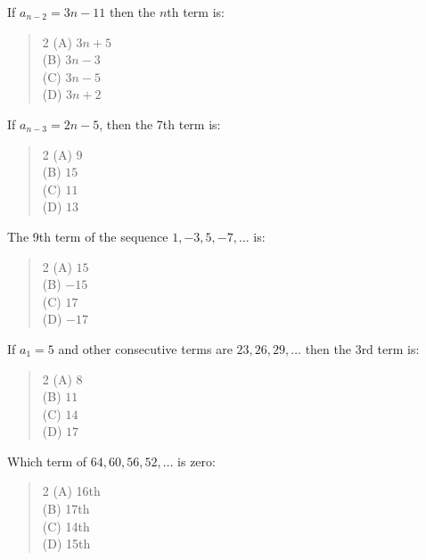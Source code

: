 \documentclass[11pt,a4paper]{article}
\begin{document}
\begin{mcqlist}
\item If $a_{n-2}=3n-11$ then the $n$th term is:
\begin{quote}\begin{multicols}{2}
\noindent (A) $3n+5$ \\
(B) $3n-3$ \\
(C) $3n-5$ \\
(D) $3n+2$
\end{multicols}\end{quote}

\item If $a_{n-3}=2n-5$, then the 7th term is:
\begin{quote}\begin{multicols}{2}
\noindent (A) $9$ \\
(B) $15$ \\
(C) $11$ \\
(D) $13$
\end{multicols}\end{quote}

\item The 9th term of the sequence $1,-3,5,-7,\ldots$ is:
\begin{quote}\begin{multicols}{2}
\noindent (A) $15$ \\
(B) $-15$ \\
(C) $17$ \\
(D) $-17$
\end{multicols}\end{quote}

\item If $a_1=5$ and other consecutive terms are $23,26,29,\ldots$ then the 3rd term is:
\begin{quote}\begin{multicols}{2}
\noindent (A) $8$ \\
(B) $11$ \\
(C) $14$ \\
(D) $17$
\end{multicols}\end{quote}

\item Which term of $64,60,56,52,\ldots$ is zero:
\begin{quote}\begin{multicols}{2}
\noindent (A) 16th \\
(B) 17th \\
(C) 14th \\
(D) 15th
\end{multicols}\end{quote}


\end{mcqlist}
\end{document}
